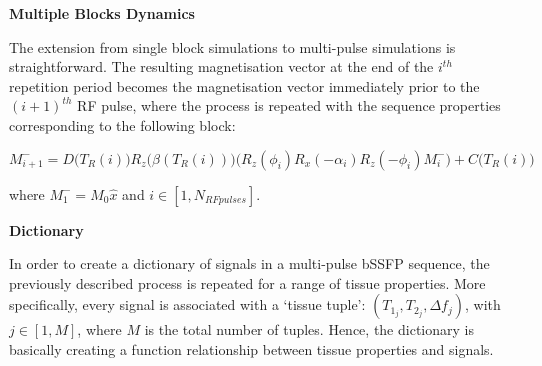 \hfill

\large \textbf{Multiple Blocks Dynamics} \normalsize

The extension from single block simulations to multi-pulse simulations is straightforward.
The resulting magnetisation vector at the end of the $i^{th}$ repetition period becomes the magnetisation vector immediately prior to the $(i+1)^{th}$ RF pulse, where the process is repeated with the sequence properties corresponding to the following block:

\begin{equation}
    M^{-}_{i+1} = D\big(T_R(i)\big) R_z\big(\beta(T_R(i))\big) \big( R_{z}(\phi_i) R_{x}(-\alpha_i) R_{z}(-\phi_i) M^{-}_i \big) + C\big(T_R(i)\big)
\end{equation}

where $M^{-}_1 = M_0 \hat{x}$ and $i \in [1, N_{RF pulses}]$.

\hfill



\large \textbf{Dictionary} \normalsize

In order to create a dictionary of signals in a multi-pulse bSSFP sequence, the previously described process is repeated for a range of tissue properties.
More specifically, every signal is associated with a `tissue tuple':
$(T_{1_j}, T_{2_j}, \Delta f_{j})$, with $j \in [1, M]$, where $M$ is the total number of tuples.
Hence, the dictionary is basically creating a function relationship between tissue properties and signals.

\hfill

